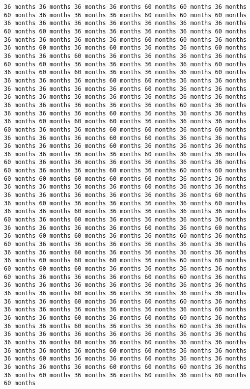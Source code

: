 \documentclass[11pt]{article}
\begin{document}
\begin{Verbatim}[commandchars=\\\{\}, frame=single, framerule=2mm, rulecolor=\color{outerrorbackground}]
36 months 36 months 36 months 36 months 60 months 60 months 36 months 60 months 36 months 36 months 36 months 60 months 60 months 60 months 36 months 36 months 36 months 36 months 36 months 36 months 36 months 60 months 60 months 36 months 36 months 36 months 36 months 60 months 36 months 36 months 36 months 36 months 60 months 60 months 36 months 36 months 60 months 36 months 60 months 36 months 36 months 60 months 36 months 36 months 60 months 36 months 36 months 36 months 36 months 60 months 60 months 36 months 36 months 36 months 36 months 60 months 36 months 60 months 60 months 36 months 36 months 36 months 60 months 36 months 36 months 36 months 60 months 60 months 36 months 36 months 36 months 36 months 36 months 36 months 60 months 36 months 36 months 36 months 36 months 36 months 36 months 36 months 36 months 36 months 36 months 36 months 36 months 36 months 36 months 60 months 36 months 36 months 36 months 36 months 60 months 36 months 36 months 36 months 36 months 60 months 60 months 60 months 36 months 36 months 36 months 60 months 36 months 36 months 60 months 60 months 36 months 60 months 36 months 36 months 36 months 60 months 60 months 36 months 36 months 36 months 36 months 36 months 60 months 36 months 36 months 36 months 36 months 36 months 36 months 36 months 60 months 36 months 36 months 60 months 36 months 36 months 36 months 36 months 36 months 36 months 60 months 36 months 36 months 60 months 36 months 60 months 60 months 60 months 60 months 60 months 60 months 60 months 36 months 36 months 36 months 36 months 36 months 36 months 60 months 36 months 36 months 36 months 36 months 36 months 36 months 36 months 36 months 60 months 36 months 60 months 36 months 36 months 36 months 36 months 60 months 36 months 36 months 60 months 36 months 36 months 36 months 36 months 60 months 36 months 60 months 36 months 36 months 36 months 36 months 36 months 36 months 36 months 36 months 60 months 36 months 60 months 36 months 60 months 60 months 36 months 36 months 60 months 36 months 60 months 36 months 36 months 36 months 36 months 36 months 36 months 36 months 36 months 60 months 36 months 36 months 36 months 36 months 36 months 60 months 60 months 60 months 36 months 60 months 60 months 60 months 60 months 60 months 36 months 36 months 36 months 36 months 60 months 36 months 36 months 36 months 60 months 60 months 36 months 36 months 36 months 36 months 36 months 36 months 36 months 36 months 36 months 36 months 60 months 36 months 36 months 36 months 36 months 36 months 36 months 60 months 36 months 60 months 60 months 36 months 36 months 36 months 36 months 36 months 36 months 36 months 60 months 36 months 36 months 60 months 36 months 60 months 60 months 36 months 36 months 36 months 60 months 36 months 36 months 60 months 36 months 36 months 36 months 36 months 36 months 36 months 36 months 36 months 36 months 36 months 60 months 36 months 60 months 36 months 36 months 36 months 36 months 36 months 60 months 60 months 36 months 36 months 36 months 60 months 36 months 36 months 60 months 36 months 36 months 36 months 36 months 36 months 60 months 60 months 60 months 36 months 36 months 60 months 36 months 36 months 60 months 36 months 60 months 60 months 
\end{Verbatim}
\end{document}
